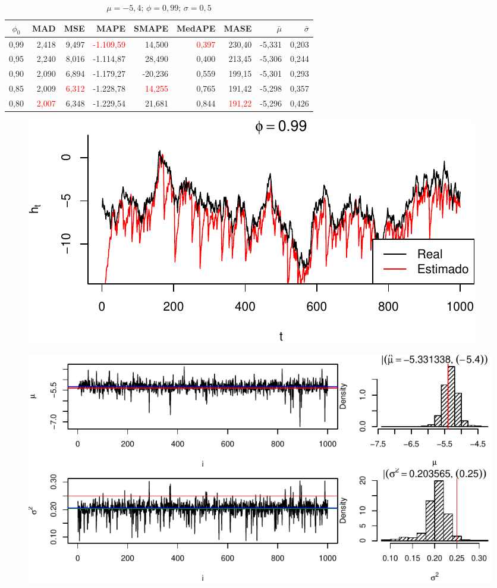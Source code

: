\documentclass[12pt, a4paper]{article}
\begin{document}
\newpage
\begin{table}[ht]
  \centering
  \caption{$\mu =-5,4$; $\phi = 0,99$; $\sigma = 0,5$}
  \begin{tabular}{c|rrrrrr|rr}
    \hline
    $\phi_0$ & MAD & MSE & MAPE & SMAPE & MedAPE & MASE & $\bar{\mu}$ & $\bar{\sigma}$\\
    \hline
    0,99 & 2,418 & 9,497 & \textcolor{red}{-1.109,59} & 14,500 & \textcolor{red}{0,397} & 230,40 & -5,331 & 0,203\\
    0,95 & 2,240 & 8,016 & -1.114,87 & 28,490 & 0,400 & 213,45 & -5,306 & 0,244\\
    0,90 & 2,090 & 6,894 & -1.179,27 & -20,236 & 0,559 & 199,15 & -5,301 & 0,293\\
    0,85 & 2,009 & \textcolor{red}{6,312} & -1.228,78 & \textcolor{red}{14,255} & 0,765 & 191,42 & -5,298 & 0,357\\
    0,80 & \textcolor{red}{2,007} & 6,348 & -1.229,54 & 21,681 & 0,844 & \textcolor{red}{191,22} & -5,296 & 0,426\\
    \hline
  \end{tabular}  
\end{table}

\begin{figure}[ht]
  \centering
  \includegraphics{img/p099s05_final}
\end{figure}

\begin{figure}[H]
  \centering
  \includegraphics{img/p099s05_resultado}
\end{figure}
\end{document}
